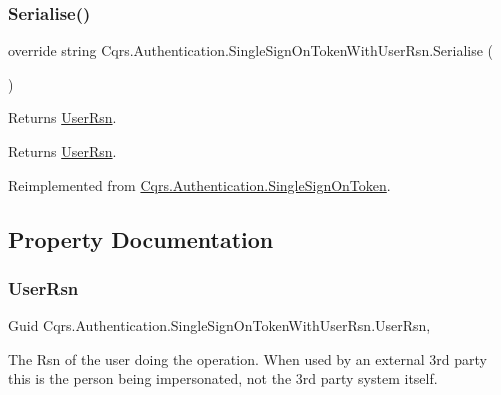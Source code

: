 \subsubsection{\texorpdfstring{Serialise()}{Serialise()}}
{\footnotesize\ttfamily override string Cqrs.\+Authentication.\+Single\+Sign\+On\+Token\+With\+User\+Rsn.\+Serialise (\begin{DoxyParamCaption}{ }\end{DoxyParamCaption})\hspace{0.3cm}{\ttfamily [virtual]}}



Returns \hyperlink{classCqrs_1_1Authentication_1_1SingleSignOnTokenWithUserRsn_a47d20dd286cf61cc23028e75cddcca79_a47d20dd286cf61cc23028e75cddcca79}{User\+Rsn}. 

\begin{DoxyReturn}{Returns}
\hyperlink{classCqrs_1_1Authentication_1_1SingleSignOnTokenWithUserRsn_a47d20dd286cf61cc23028e75cddcca79_a47d20dd286cf61cc23028e75cddcca79}{User\+Rsn}.
\end{DoxyReturn}


Reimplemented from \hyperlink{classCqrs_1_1Authentication_1_1SingleSignOnToken_a5e859c6c5db5aaa9ef4e8f2086df4604_a5e859c6c5db5aaa9ef4e8f2086df4604}{Cqrs.\+Authentication.\+Single\+Sign\+On\+Token}.



\subsection{Property Documentation}
\mbox{\label{classCqrs_1_1Authentication_1_1SingleSignOnTokenWithUserRsn_a47d20dd286cf61cc23028e75cddcca79_a47d20dd286cf61cc23028e75cddcca79}} 
\subsubsection{\texorpdfstring{User\+Rsn}{UserRsn}}
{\footnotesize\ttfamily Guid Cqrs.\+Authentication.\+Single\+Sign\+On\+Token\+With\+User\+Rsn.\+User\+Rsn\hspace{0.3cm}{\ttfamily [get]}, {\ttfamily [set]}}



The Rsn of the user doing the operation. When used by an external 3rd party this is the person being impersonated, not the 3rd party system itself. 

